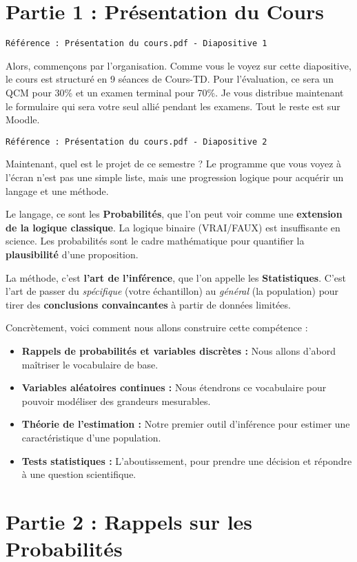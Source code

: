 \documentclass[12pt, a4paper]{article}
\newcommand{\slidenote}[1]{%
    \par\vspace{1.5ex}%
    \noindent\texttt{\small\color{gray}#1}\par\nopagebreak\vspace{1.5ex}%
}
\begin{document}
\section*{Partie 1 : Présentation du Cours}

\slidenote{Référence : Présentation du cours.pdf - Diapositive 1}
Alors, commençons par l'organisation. Comme vous le voyez sur cette diapositive, le cours est structuré en 9 séances de Cours-TD. Pour l'évaluation, ce sera un QCM pour 30\% et un examen terminal pour 70\%. Je vous distribue maintenant le formulaire qui sera votre seul allié pendant les examens. Tout le reste est sur Moodle.

\slidenote{Référence : Présentation du cours.pdf - Diapositive 2}
Maintenant, quel est le projet de ce semestre ? Le programme que vous voyez à l'écran n'est pas une simple liste, mais une progression logique pour acquérir un langage et une méthode.

Le langage, ce sont les \textbf{Probabilités}, que l'on peut voir comme une \textbf{extension de la logique classique}. La logique binaire (VRAI/FAUX) est insuffisante en science. Les probabilités sont le cadre mathématique pour quantifier la \textbf{plausibilité} d'une proposition.

La méthode, c'est \textbf{l'art de l'inférence}, que l'on appelle les \textbf{Statistiques}. C'est l'art de passer du \textit{spécifique} (votre échantillon) au \textit{général} (la population) pour tirer des \textbf{conclusions convaincantes} à partir de données limitées.

Concrètement, voici comment nous allons construire cette compétence :
\begin{itemize}
    \item \textbf{Rappels de probabilités et variables discrètes :} Nous allons d'abord maîtriser le vocabulaire de base.
    \item \textbf{Variables aléatoires continues :} Nous étendrons ce vocabulaire pour pouvoir modéliser des grandeurs mesurables.
    \item \textbf{Théorie de l'estimation :} Notre premier outil d'inférence pour estimer une caractéristique d'une population.
    \item \textbf{Tests statistiques :} L'aboutissement, pour prendre une décision et répondre à une question scientifique.
\end{itemize}

\section*{Partie 2 : Rappels sur les Probabilités}
\end{document}
